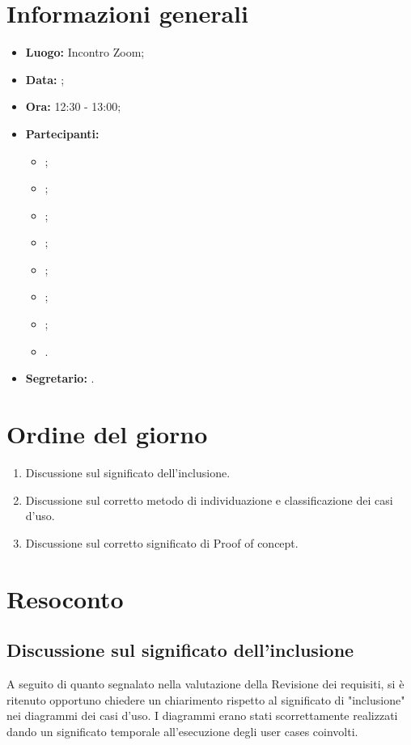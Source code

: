 \section{Informazioni generali}
\begin{itemize}
\item \textbf{Luogo:} Incontro Zoom;
\item \textbf{Data:} \Data;
\item \textbf{Ora:} 12:30 - 13:00;
\item \textbf{Partecipanti:}
	\begin{itemize}
		\item \BL{}; 
		\item \FF{};
		\item \MM{};
		\item \PC{};
		\item \TG{};
		\item \TL{};
		\item \VD{};
		\item \CR{}.
	\end{itemize}
\item \textbf{Segretario:} \TG{}.
\end{itemize}

\section{Ordine del giorno}
\begin{enumerate}
	\item Discussione sul significato dell'inclusione.
	\item Discussione sul corretto metodo di individuazione e classificazione dei casi d'uso.
	\item Discussione sul corretto significato di Proof of concept.
\end{enumerate}

\section{Resoconto}
\subsection{Discussione sul significato dell'inclusione}
A seguito di quanto segnalato nella valutazione della Revisione dei requisiti, si è ritenuto opportuno chiedere un chiarimento rispetto al significato di "inclusione" nei diagrammi dei casi d'uso. I diagrammi erano stati scorrettamente realizzati dando un significato temporale all'esecuzione degli user cases coinvolti.

